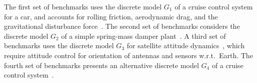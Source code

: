 \documentclass[final]{sig-alternate-05-2015}
\begin{document}
The first set of benchmarks uses the discrete model $G_1$ of a cruise control
system for a car, and accounts for rolling friction, aerodynamic drag, and
the gravitational disturbance force~\cite{Astrom08}. 
%
%
The second set of benchmarks considers the discrete model $G_2$ 
of a simple spring-mass damper plant~\cite{DBLP:conf/hybrid/WangGRJF16}. 
%
%
A third set of benchmarks uses the discrete model $G_{3}$ for satellite attitude 
dynamics~\cite{Franklin15}, which require attitude control
for orientation of antennas and sensors w.r.t.~Earth.
The fourth set of benchmarks presents an alternative discrete model $G_4$ 
of a cruise control system~\cite{DBLP:conf/hybrid/WangGRJF16}. 
%
%
%
%
%
%
%
\end{document}
